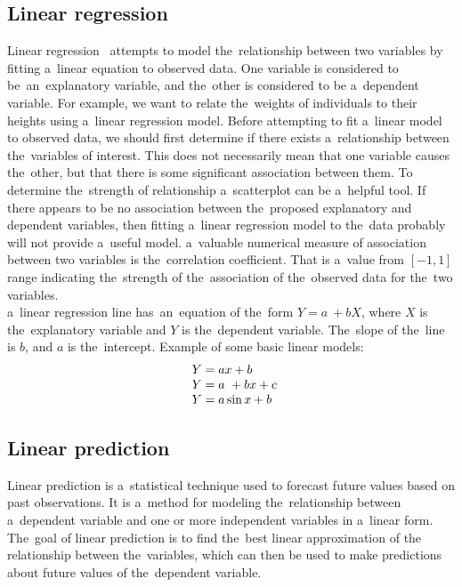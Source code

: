         \subsection{Linear regression}\label{sec:linear}
        Linear regression~\cite{Levinson} attempts to model the~relationship between two variables by fitting a~linear
        equation to observed data. One variable is considered to be~an~explanatory variable, and the~other is
        considered to be a~dependent variable. For example, we want to relate the~weights of individuals to their
        heights using a~linear regression model. Before attempting to fit a~linear model to observed data, we should
        first determine if there exists a~relationship between the~variables of interest. This does not necessarily
        mean that one variable causes the~other, but that there is some significant association between them.
        To determine the~strength of relationship a~scatterplot can be a~helpful tool.
        If there appears to be no association between the~proposed explanatory and dependent variables, then
        fitting a~linear regression model to the~data probably will not provide a~useful model.
        a~valuable numerical measure of association between two variables is the~correlation coefficient.
        That is a~value from $[-1, 1]$ range indicating the~strength of the~association of the~observed data
        for the~two variables.\\
        a~linear regression line has~an~equation of the~form $Y = a~+ bX$, where $X$ is the~explanatory variable
        and $Y$ is the~dependent variable. The~slope of the~line is $b$, and $a$ is the~intercept.
        Example of some basic linear models:\\
        \begin{equation} \label{eq:4}
        \begin{array}{l@{}l}
            Y = ax + b\\
            Y = a~+ bx + c\\
            Y = a\sin x + b\\
        \end{array}
        \end{equation}
        \subsection{Linear prediction}\label{subsec:lp}
        Linear prediction is a~statistical technique used to forecast future values based on past observations.
        It is a~method for modeling the~relationship between a~dependent variable and one or more independent
        variables in a~linear form. The~goal of linear prediction is to find the~best linear approximation of the
        relationship between the~variables, which can then be used to make predictions about future
        values of the~dependent variable.
